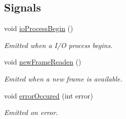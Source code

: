 \subsection*{Signals}
\begin{DoxyCompactItemize}
\item 
void \hyperlink{classmdt_port_thread_a8f3d8f3d70839e5ae7b108a3a199e94d}{ioProcessBegin} ()
\begin{DoxyCompactList}\small\item\em Emitted when a I/O process begins. \end{DoxyCompactList}\item 
void \hyperlink{classmdt_port_thread_a7fc2245c753fd65e1beffec211c41461}{newFrameReaden} ()
\begin{DoxyCompactList}\small\item\em Emited when a new frame is available. \end{DoxyCompactList}\item 
void \hyperlink{classmdt_port_thread_ab31cbe1a85aa830cd368654d1f806326}{errorOccured} (int error)
\begin{DoxyCompactList}\small\item\em Emitted on error. \end{DoxyCompactList}\end{DoxyCompactItemize}
